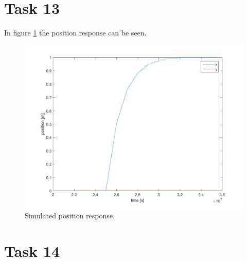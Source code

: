 \documentclass[a4paper,12pt,oneside,onecolumn]{article} %
\begin{document}
\section*{Task 13}

 In figure \ref{fig:task13_positionplot} the position response can be seen.

\begin{figure}[H]
        \centering
        \includegraphics[scale = 0.5]{../matlab/images/task13_positionplot.png}
        \caption{Simulated position response.}
        \label{fig:task13_positionplot}
    \end{figure}

\section*{Task 14}
\end{document}
